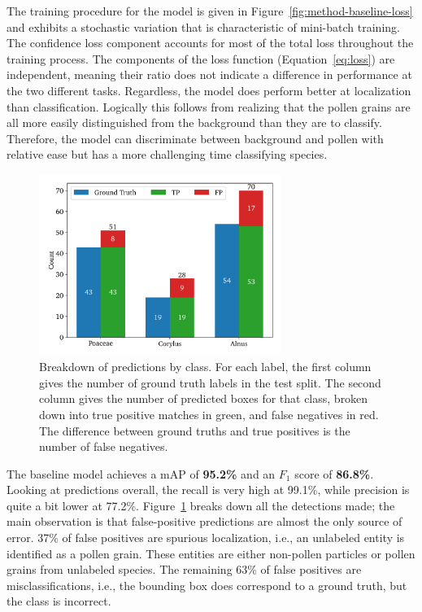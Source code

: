 The training procedure for the model is given in Figure~\ref{fig:method-baseline-loss} and exhibits a stochastic variation that is characteristic of mini-batch training.
The confidence loss component accounts for most of the total loss throughout the training process.
The components of the loss function (Equation~\ref{eq:loss}) are independent, meaning their ratio does not indicate a difference in performance at the two different tasks.
Regardless, the model does perform better at localization than classification.
Logically this follows from realizing that the pollen grains are all more easily distinguished from the background than they are to classify.
Therefore, the model can discriminate between background and pollen with relative ease but has a more challenging time classifying species.

\begin{figure}[htbp]
    \centering
    \includegraphics[width=0.7\textwidth]{figs/results/baseline/detections_test.pdf}
    \caption[Detections by type by class for the baseline on the test split]{%
Breakdown of predictions by class.
For each label, the first column gives the number of ground truth labels in the test split.
The second column gives the number of predicted boxes for that class, broken down into true positive matches in green, and false negatives in red.
The difference between ground truths and true positives is the number of false negatives.
    }\label{fig:results-baseline-detections}
  \end{figure}

The baseline model achieves a mAP of \textbf{95.2\%} and an \(F_1\) score of \textbf{86.8\%}.
Looking at predictions overall, the recall is very high at 99.1\%, while precision is quite a bit lower at 77.2\%.
Figure~\ref{fig:results-baseline-detections} breaks down all the detections made; the main observation is that false-positive predictions are almost the only source of error.
37\% of false positives are spurious localization, i.e., an unlabeled entity is identified as a pollen grain.
These entities are either non-pollen particles or pollen grains from unlabeled species.
The remaining 63\% of false positives are misclassifications, i.e., the bounding box does correspond to a ground truth, but the class is incorrect.

